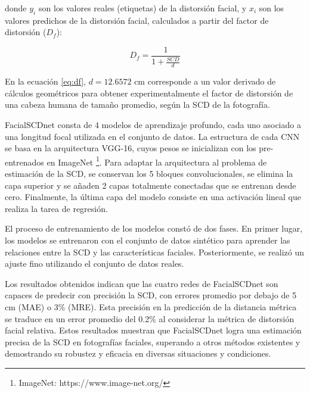 donde $y_i$ son los valores reales (etiquetas) de la distorsión facial, y $x_i$ son los valores predichos de la distorsión facial, calculados a partir del factor de distorsión ($D_f$):

\begin{equation}
	D_f = \frac{1}{1 + \frac{SCD}{d}}
	\label{eq:df}
\end{equation}

En la ecuación \ref{eq:df}, $d = 12.6572 $ cm corresponde a un valor derivado de cálculos geométricos \cite{55} para obtener experimentalmente el factor de distorsión de una cabeza humana de tamaño promedio, según la SCD de la fotografía.

FacialSCDnet consta de 4 modelos de aprendizaje profundo, cada uno asociado a una longitud focal utilizada en el conjunto de datos. La estructura de cada CNN se basa en la arquitectura VGG-16, cuyos pesos se inicializan con los pre-entrenados en ImageNet \footnote{ImageNet: https://www.image-net.org/}. Para adaptar la arquitectura al problema de estimación de la SCD, se conservan los 5 bloques convolucionales, se elimina la capa superior y se añaden 2 capas totalmente conectadas que se entrenan desde cero. Finalmente, la última capa del modelo consiste en una activación lineal que realiza la tarea de regresión.

El proceso de entrenamiento de los modelos constó de dos fases. En primer lugar, los modelos se entrenaron con el conjunto de datos sintético para aprender las relaciones entre la SCD y las características faciales. Posteriormente, se realizó un ajuste fino utilizando el conjunto de datos reales.

Los resultados obtenidos indican que las cuatro redes de FacialSCDnet son capaces de predecir con precisión la SCD, con errores promedio por debajo de 5 cm (MAE) o 3\% (MRE). Esta precisión en la predicción de la distancia métrica se traduce en un error promedio del 0.2\% al considerar la métrica de distorsión facial relativa. Estos resultados muestran que FacialSCDnet logra una estimación precisa de la SCD en fotografías faciales, superando a otros métodos existentes y demostrando su robustez y eficacia en diversas situaciones y condiciones.